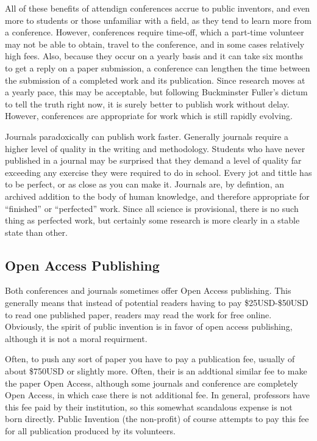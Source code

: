 \documentclass[
	fontsize=10pt, %
	twoside=false, %
	secnumdepth=1, %
]{kaobook}
\begin{document}
All of these benefits of attendign conferences accrue to public inventors, and even more
to students or those unfamiliar with a field, as they tend to learn more from a conference.
However, conferences require time-off, which a part-time volunteer may not be able to obtain,
travel to the conference, and in some cases relatively high fees. Also, because
they occur on a yearly basis and it can take six months to get a reply on a paper submission,
a conference can lengthen the time between the submission of a completed work and its
publication. Since research moves at a yearly pace, this may be acceptable, but following
Buckminster Fuller's dictum to tell the truth right now, it is surely better to publish
work without delay. However, conferences are appropriate for work which is still rapidly
evolving.

Journals paradoxically can publish work faster. Generally journals require a higher level
of quality in the writing and methodology. Students who have never published in a journal
may be surprised that they demand a level of quality far exceeding any exercise they
were required to do in school. Every jot and tittle has to be perfect, or as close as
you can make it. Journals are, by defintion, an archived addition to the body of human
knowledge, and therefore appropriate for ``finished'' or ``perfected'' work. Since all
science is provisional, there is no such thing as perfected work, but certainly
some research is more clearly in a stable state than other.

\subsection{Open Access Publishing}

Both conferences and journals sometimes offer Open Access publishing. This generally means
that instead of potential readers having to pay \$25USD-\$50USD to read one published paper, readers
may read the work for free online. Obviously, the spirit of public invention is in favor
of open access publishing, although it is not a moral requirment.

Often, to push any sort of paper you have to pay a publication fee, usually of about
\$750USD or slightly more. Often, their is an addtional similar fee to make the paper Open Access,
although some journals and conference are completely Open Access, in which case there is not additional fee.
In general, professors have this fee paid by their institution,
so this somewhat scandalous expense is not born directly. Public Invention (the non-profit) of
course attempts to pay this fee for all publication produced by its volunteers.
\end{document}
